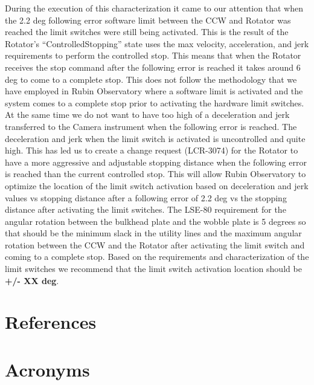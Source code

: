 \documentclass[SE,lsstdraft,authoryear,toc]{lsstdoc}
\begin{document}
During the execution of this characterization it came to our attention that when the 2.2 deg following error software limit between the CCW and Rotator was reached the limit switches were still being activated. This is the result of the Rotator’s “ControlledStopping” state uses the max velocity, acceleration, and jerk requirements to perform the controlled stop. This means that when the Rotator receives the stop command after the following error is reached it takes around 6 deg to come to a complete stop. This does not follow the methodology that we have employed in Rubin Observatory where a software limit is activated and the system comes to a complete stop prior to activating the hardware limit switches. At the same time we do not want to have too high of a deceleration and jerk transferred to the Camera instrument when the following error is reached. The deceleration and jerk when the limit switch is activated is uncontrolled and quite high. This has led us to create a change request  (LCR-3074) for the Rotator to have a more aggressive and adjustable stopping distance when the following error is reached than the current controlled stop. This will allow Rubin Observatory to optimize the location of the limit switch activation based on deceleration and jerk values vs stopping distance after a following error of 2.2 deg vs the stopping distance after activating the limit switches. The LSE-80 requirement for the angular rotation between the bulkhead plate and the wobble plate is 5 degrees so that should be the minimum slack in the utility lines and the maximum angular rotation between the CCW and the Rotator after activating the limit switch and coming to a complete stop.
Based on the requirements and characterization of the limit switches we recommend that the limit switch activation location should be {\color{red} \textbf{+/- XX deg}}.
\newpage

\appendix
\section{References} \label{sec:bib}
\renewcommand{\refname}{} %


\section{Acronyms} \label{sec:acronyms}

\end{document}
